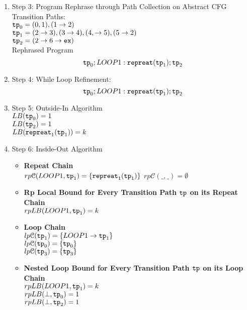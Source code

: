 \begin{example}
\begin{enumerate}
  \item Step 3: Program Rephrase through Path Collection on Abstract CFG
  \\
  Transition Paths:
  \\
  $\mathtt{tp}_0 = (0, 1), (1 \to 2)$
  \\
  $\mathtt{tp}_1 =  (2 \to 3), (3 \to 4), (4, \to 5), (5 \to 2)$
  \\
  $\mathtt{tp}_2 = (2 \to 6 \to \mathtt{ex})$
  \\
  Rephrased Program
  \[
  \mathtt{tp}_0 ; LOOP1: \mathtt{repreat}(\mathtt{tp}_1); \mathtt{tp}_2
  \]
  \item Step 4: While Loop Refinement:
  \[
    \mathtt{tp}_0 ; LOOP1: \mathtt{repreat}(\mathtt{tp}_1); \mathtt{tp}_2
  \]
  \item Step 5: Outside-In Algorithm
  \\
  $LB(\mathtt{tp}_0) = 1$
  \\
  $LB(\mathtt{tp}_2) = 1$
  \\
  $LB(\mathtt{repreat}_1(\mathtt{tp}_1)) = k $
  \item Step 6: Inside-Out Algorithm
  \begin{itemize}
    \item \textbf{Repeat Chain}
    \\
    $rp\mathcal{C}(LOOP1, \mathtt{tp}_1) = \{\mathtt{repreat}_1(\mathtt{tp}_1)\}$ 
    $rp\mathcal{C}(\_, \_) = \emptyset$ 
    \item \textbf{Rp Local Bound for Every Transition Path $\mathtt{tp}$ on its Repeat Chain}
    \\
    $rpLB(LOOP1, \mathtt{tp}_1) = k$
    \item \textbf{Loop Chain}
    \\
    $lp\mathcal{C}(\mathtt{tp}_1) = \{LOOP1\to \mathtt{tp}_1\}$ \\
    $lp\mathcal{C}(\mathtt{tp}_0) = \{\mathtt{tp}_0\}$ \\
    $lp\mathcal{C}(\mathtt{tp}_3) = \{\mathtt{tp}_3\}$ 
    \item \textbf{Nested Loop Bound for Every Transition Path $\mathtt{tp}$ on its Loop Chain}
    \\
    $rpLB(LOOP1, \mathtt{tp}_1) =   k$
  \\
    $rpLB(\bot, \mathtt{tp}_0) = 1$ \\
    $rpLB(\bot, \mathtt{tp}_2) = 1$ 

\end{itemize}
\end{enumerate}
\end{example}
